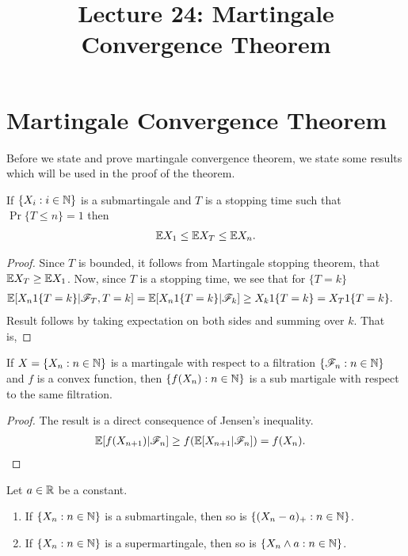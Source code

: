\documentclass[a4paper,10pt,english]{article}
\title{Lecture 24: Martingale Convergence Theorem}
\author{}
\begin{document}
\maketitle

\section{Martingale Convergence Theorem}
Before we state and prove martingale convergence theorem, we state some results which will be used in the proof of the theorem.
\begin{lem}
\label{StoppingTimeBound}
If $\{X_i:  i \in \mathbb{N} \}$ is  a submartingale and $T$ is a stopping time such that $\Pr\{T \leq n\}=1$ then
\begin{align*}
 \mathbb{E} X_1 \leq \mathbb{E} X_T \leq \mathbb{E} X_n.
\end{align*}
\end{lem}
\begin{proof}
Since $T$ is bounded, it follows from Martingale stopping theorem, that $\mathbb{E} X_T  \geq \mathbb{E} X_1$. 
Now, since $T$ is a stopping time, we see that for $\{T = k\}$
\begin{align*}
\E[X_n1\{T = k\}|\F_T,T=k]&= %
\E[X_n1\{T = k\}|\F_k] \geq X_k1\{T = k \} = X_T1\{T = k\}.
\end{align*}
Result follows by taking expectation on both sides and summing over $k$. 
That is,
\end{proof}

\begin{lem}
\label{ConvexFuncSubmart}
If $X = \{X_n: n \in \mathbb{N}\}$ is a martingale with respect to a filtration $\{\mathscr{F}_n: n \in \mathbb{N}\}$ and $f$ is a convex function, 
then $\{f(X_n): n \in \mathbb{N}\}$ is a sub martigale with respect to the same filtration.
\end{lem}
\begin{proof}
The result is a direct consequence of Jensen's inequality.
\begin{align*}
\mathbb{E}[f(X_{n+1})|\mathscr{F}_n] &\geq f(\mathbb{E}[X_{n+1}|\mathscr{F}_n])=f(X_n).
\end{align*}
\end{proof}

\begin{cor} 
Let $a \in \mathbb{R}$ be a constant. 
\begin{enumerate}[i\_]
\item If $\{X_n : n \in \mathbb{N}\}$ is a submartingale, then so is $\{(X_n - a)_+: n \in \mathbb{N}\}$.  
\item If $\{X_n : n \in \mathbb{N}\}$ is a supermartingale, then so is $\{X_n \wedge a: n \in \mathbb{N}\}$. 
\end{enumerate}
\end{cor}
\end{document}
